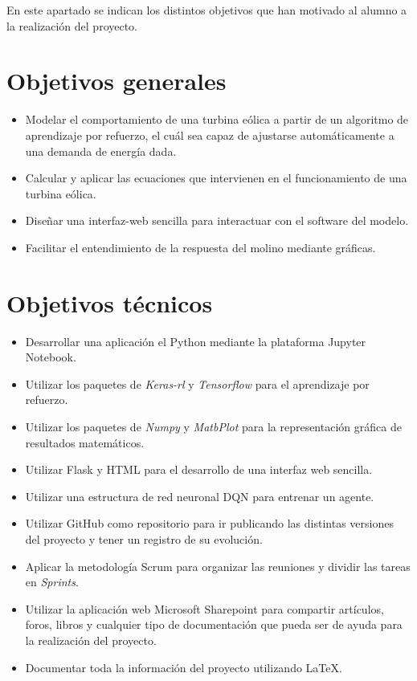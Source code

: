 
En este apartado se indican los distintos objetivos que han motivado al alumno a la realización del proyecto.

\section{Objetivos generales}

\begin{itemize}
    \item Modelar el comportamiento de una turbina eólica a partir de un algoritmo de aprendizaje por refuerzo, el cuál sea capaz de ajustarse automáticamente a una demanda de energía dada.
    \item Calcular y aplicar las ecuaciones que intervienen en el funcionamiento de una turbina eólica.
    \item Diseñar una interfaz-web sencilla para interactuar con el software del modelo.
    \item Facilitar el entendimiento de la respuesta del molino mediante gráficas.
\end{itemize}


\section{Objetivos técnicos}

\begin{itemize}
    \item Desarrollar una aplicación el Python\cite{Python} mediante la plataforma Jupyter Notebook\cite{Jupyter}.
    \item Utilizar los paquetes de \textit{Keras-rl} y \textit{Tensorflow} para el aprendizaje por refuerzo.
    \item Utilizar los paquetes de \textit{Numpy} y \textit{MatbPlot} para la representación gráfica de resultados matemáticos.
    \item Utilizar Flask\cite{Flask} y HTML\cite{HTML} para el desarrollo de una interfaz web sencilla.
    \item Utilizar una estructura de red neuronal DQN\cite{wiki:DQN} para entrenar un agente.
    \item Utilizar GitHub\cite{GitHub} como repositorio para ir publicando las distintas versiones del proyecto y tener un registro de su evolución.
    \item Aplicar la metodología Scrum\cite{MetScrum} para organizar las reuniones y dividir las tareas en \textit{Sprints}.
    \item Utilizar la aplicación web Microsoft Sharepoint\cite{Sharepoint} para compartir artículos, foros, libros y cualquier tipo de documentación que pueda ser de ayuda para la realización del proyecto.
    \item Documentar toda la información del proyecto utilizando \LaTeX\cite{wiki:latex}.
\end{itemize}


